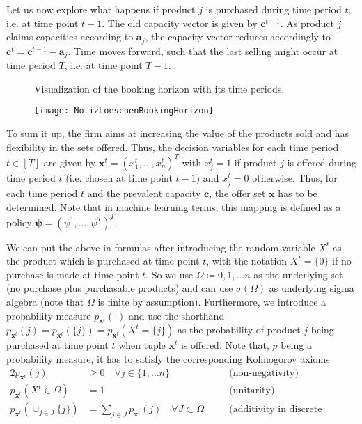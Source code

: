 Let us now explore what happens if product $j$ is purchased during time period $t$, i.e. at time point $t-1$. The old capacity vector is given by $\boldsymbol{c}^{t-1}$. As product $j$ claims capacities according to $\boldsymbol{a}_j$,  the capacity vector reduces accordingly to $\boldsymbol{c}^{t} = \boldsymbol{c}^{t-1} - \boldsymbol{a}_j$. Time moves forward, such that the last selling might occur at time period $T$, i.e. at time point $T-1$.

\begin{figure}
	\centering
	\caption{Visualization of the booking horizon with its time periods.\label{fig:Prob:Horizon}}
	\texttt{[image: NotizLoeschenBookingHorizon]}
	\caption{}
	\label{fig:notizloeschenbookinghorizon}
\end{figure}


\clearpage
\setcounter{page}{1}
\noindent{}

To sum it up, the firm aims at increasing the value of the products sold and has flexibility in the sets offered. Thus, the decision variables for each time period $t \in [T]$ are given by $\boldsymbol{x}^t = (x^t_1, \dots, x^t_n)^T$ with $x^t_j = 1$ if product $j$ is offered during time period $t$ (i.e. chosen at time point $t-1$) and $x^t_j = 0$ otherwise. Thus, for each time period $t$ and the prevalent capacity $\boldsymbol{c}$, the offer set $\boldsymbol{x}$ has to be determined. Note that in machine learning terms, this mapping is defined as a policy $\boldsymbol{\psi} = (\psi^1, \dots, \psi^T)^T$.

We can put the above in formulas after introducing the random variable $X^t$ as the product which is purchased at time point $t$, with the notation $X^t=\{0\}$ if no purchase is made at time point $t$. 
So we use $\Omega \coloneqq {0, 1, \dots n}$ as the underlying set (no purchase plus purchasable products) and can use $\sigma(\Omega)$ as underlying sigma algebra (note that $\Omega$ is finite by assumption). 
Furthermore, we introduce a probability measure $p_{\boldsymbol{x}^t}(\cdot)$ 
and use the shorthand $p_{\boldsymbol{x}^t}(j) = p_{\boldsymbol{x}^t}(\{j\}) = p_{\boldsymbol{x}^t}(X^t = \{j\})$ as the probability of product $j$ being purchased at time point $t$ when tuple $\boldsymbol{x}^t$ is offered. Note that, $p$ being a probability measure, it has to satisfy the corresponding Kolmogorov axioms 
\begin{alignat}{2}
p_{\boldsymbol{x}^t}(j) &\geq 0 \quad \forall j \in \{1, \dots n\} \quad &&\text{(non-negativity)}\\
p_{\boldsymbol{x}^t}(X^t \in \Omega) &= 1 &&\text{(unitarity)}\\
p_{\boldsymbol{x}^t}(\cup_{j \in J}\{j\}) &= \sum_{j \in J}p_{\boldsymbol{x}^t}(j) \quad \forall J \subset \Omega \quad &&\text{(additivity in discrete setting)}
\end{alignat}

